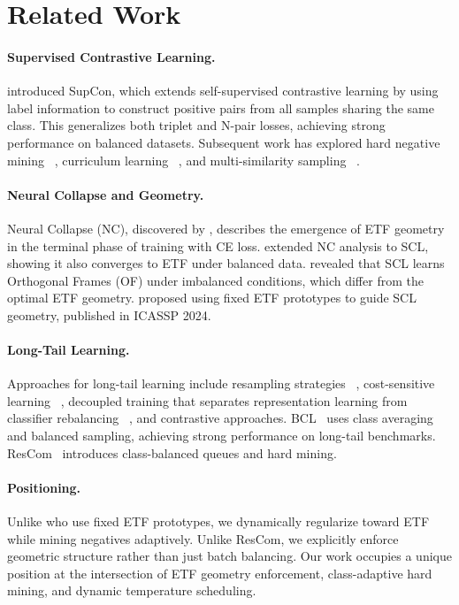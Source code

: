 \documentclass{article}
\begin{document}
\section{Related Work}

\paragraph{Supervised Contrastive Learning.} \citet{khosla2020supervised} introduced SupCon, which extends self-supervised contrastive learning by using label information to construct positive pairs from all samples sharing the same class. This generalizes both triplet and N-pair losses, achieving strong performance on balanced datasets. Subsequent work has explored hard negative mining~
\citep{jiang2022supervised}, curriculum learning~
\citep{zhuang2024curricular}, and multi-similarity sampling~
\citep{mu2023multisimilarity}.

\paragraph{Neural Collapse and Geometry.} Neural Collapse (NC), discovered by \citet{papyan2020prevalence}, describes the emergence of ETF geometry in the terminal phase of training with CE loss. \citet{graf2021dissecting} extended NC analysis to SCL, showing it also converges to ETF under balanced data. \citet{kini2023supervised} revealed that SCL learns Orthogonal Frames (OF) under imbalanced conditions, which differ from the optimal ETF geometry. \citet{gill2024engineering} proposed using fixed ETF prototypes to guide SCL geometry, published in ICASSP 2024.

\paragraph{Long-Tail Learning.} Approaches for long-tail learning include resampling strategies~
\citep{chawla2002smote}, cost-sensitive learning~
\citep{cui2019class}, decoupled training that separates representation learning from classifier rebalancing~
\citep{kang2020decoupling}, and contrastive approaches. BCL~
\citep{zhu2022balanced} uses class averaging and balanced sampling, achieving strong performance on long-tail benchmarks. ResCom~
\citep{zhong2022rebalanced} introduces class-balanced queues and hard mining.

\paragraph{Positioning.} Unlike \citet{gill2024engineering} who use fixed ETF prototypes, we dynamically regularize toward ETF while mining negatives adaptively. Unlike ResCom, we explicitly enforce geometric structure rather than just batch balancing. Our work occupies a unique position at the intersection of ETF geometry enforcement, class-adaptive hard mining, and dynamic temperature scheduling.
\end{document}
